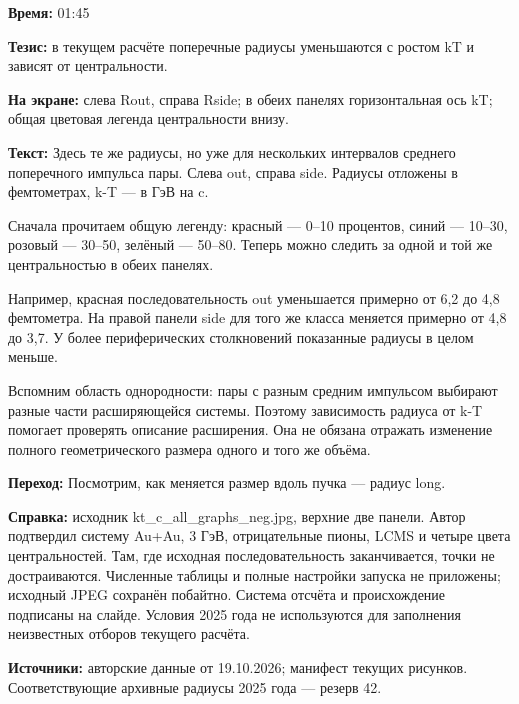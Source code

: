 \textbf{Время:} 01:45

\textbf{Тезис:} в текущем расчёте поперечные радиусы уменьшаются с ростом kT и зависят от центральности.

\textbf{На экране:} слева Rout, справа Rside; в обеих панелях горизонтальная ось kT; общая цветовая легенда центральности внизу.

\textbf{Текст:} Здесь те же радиусы, но уже для нескольких интервалов среднего поперечного импульса пары. Слева out, справа side. Радиусы отложены в фемтометрах, k-T — в ГэВ на c.

Сначала прочитаем общую легенду: красный — 0–10 процентов, синий — 10–30, розовый — 30–50, зелёный — 50–80. Теперь можно следить за одной и той же центральностью в обеих панелях.

Например, красная последовательность out уменьшается примерно от 6,2 до 4,8 фемтометра. На правой панели side для того же класса меняется примерно от 4,8 до 3,7. У более периферических столкновений показанные радиусы в целом меньше.

Вспомним область однородности: пары с разным средним импульсом выбирают разные части расширяющейся системы. Поэтому зависимость радиуса от k-T помогает проверять описание расширения. Она не обязана отражать изменение полного геометрического размера одного и того же объёма.

\textbf{Переход:} Посмотрим, как меняется размер вдоль пучка — радиус long.

\textbf{Справка:} исходник kt\_c\_all\_graphs\_neg.jpg, верхние две панели. Автор подтвердил систему Au+Au, 3 ГэВ, отрицательные пионы, LCMS и четыре цвета центральностей. Там, где исходная последовательность заканчивается, точки не достраиваются. Численные таблицы и полные настройки запуска не приложены; исходный JPEG сохранён побайтно. Система отсчёта и происхождение подписаны на слайде. Условия 2025 года не используются для заполнения неизвестных отборов текущего расчёта.

\textbf{Источники:} авторские данные от 19.10.2026; манифест текущих рисунков. Соответствующие архивные радиусы 2025 года — резерв 42.

